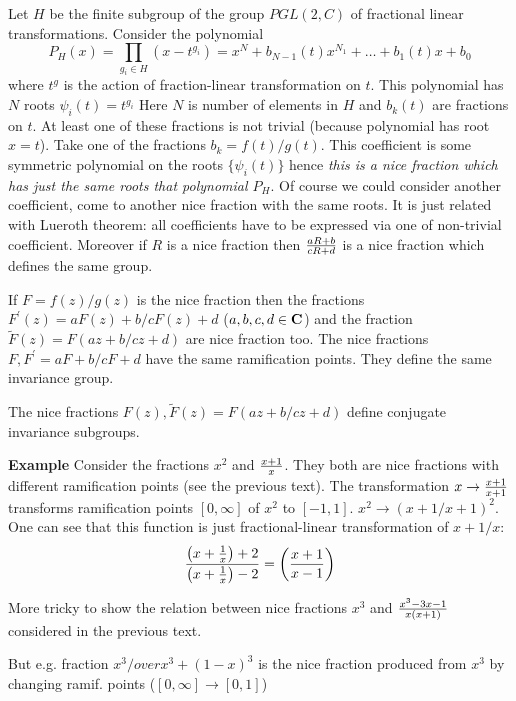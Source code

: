        Let $H$ be the finite subgroup of the group $PGL(2,C)$ of fractional linear
       transformations.  Consider the polynomial
                          $$
                   P_H(x)=\prod_{g_i\in H}\left(x-t^{g_i}\right)=x^N+
                   b_{N-1}(t)x^{N_1}+\dots+b_1(t)x+b_0
                               $$
where $t^{g}$ is the action of fraction-linear transformation on $t$. This polynomial
has $N$ roots $\psi_i(t)=t^{g_i}$
 Here $N$ is number of elements in $H$
 and  $b_k(t)$ are fractions on $t$. At least one of these fractions is not trivial
  (because polynomial has root $x=t$).
 Take one of the fractions
  $b_k=f(t)/g(t)$.  This coefficient is some symmetric polynomial
  on the roots $\{\psi_i(t)\}$ hence {\it this is a nice fraction
  which has just the same roots that polynomial $P_H$}.
  Of course we could consider another coefficient, come to another
  nice fraction with the same roots. It is just related with Lueroth theorem:
  all coefficients have to be expressed via one of non-trivial coefficient.
  Moreover if $R$ is a nice fraction then ${aR+b\over cR+d}$
is a nice fraction which defines the same group.


If  $F=f(z)/g(z)$ is the nice fraction then the fractions
 $F^\prime(z)=aF(z)+b/cF(z)+d$ ($a,b,c,d\in \bf C$)
and the fraction $\tilde F(z)=F\left(az+b/cz+d\right)$
 are nice fraction too. The nice fractions $F, F^\prime=aF+b/cF+d$
 have the same ramification points. They define the same invariance group.

The nice fractions  $F(z),\tilde F(z)=F\left(az+b/cz+d\right)$
define conjugate invariance subgroups.


  {\bf Example}  Consider the fractions $x^2$ and $x+1\over x$.
  They both are nice fractions
  with different ramification points (see the previous text).
  The transformation $x\to {x+1\over x+1}$ transforms ramification points
  $[0,\infty]$ of $x^2$ to $[-1,1]$. $x^2\to ({x+1/ x+1})^2$.
   One can see that this function is just fractional-linear transformation
  of $x+1/x$:
                      $$
         {\left(x+{1\over x}\right)+2\over \left(x+{1\over x}\right)-2}=
              \left({x+1\over x-1}\right)
                     $$

More tricky to show the relation between nice fractions
    $x^3$ and $x^3-3x-1\over x(x+1)$ considered in the previous text.

But e.g. fraction $x^3/over x^3+(1-x)^3$ is the nice fraction produced from $x^3$ by
changing ramif. points ($[0,\infty]\to [0,1]$)


